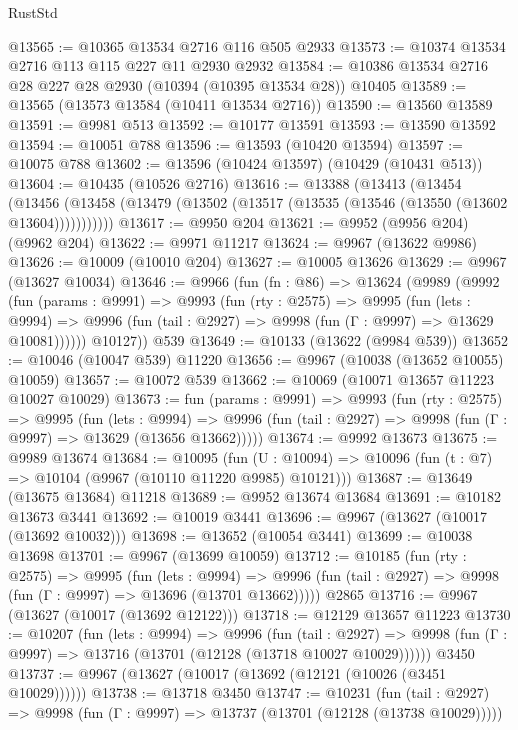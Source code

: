 \begin{lexlean}{RustStd}
\begin{coremodule}
@13565 := @10365 @13534 @2716 @116 @505 @2933
@13573 := @10374 @13534 @2716 @113 @115 @227 @11 @2930 @2932
@13584 := @10386 @13534 @2716 @28 @227 @28 @2930 (@10394 (@10395 @13534 @28)) @10405
@13589 := @13565 (@13573 @13584 (@10411 @13534 @2716))
@13590 := @13560 @13589
@13591 := @9981 @513
@13592 := @10177 @13591
@13593 := @13590 @13592
@13594 := @10051 @788
@13596 := @13593 (@10420 @13594)
@13597 := @10075 @788
@13602 := @13596 (@10424 @13597) (@10429 (@10431 @513))
@13604 := @10435 (@10526 @2716)
@13616 := @13388
    (@13413
      (@13454
        (@13456 (@13458 (@13479 (@13502 (@13517 (@13535 (@13546 (@13550 (@13602 @13604)))))))))))
@13617 := @9950 @204
@13621 := @9952 (@9956 @204) (@9962 @204)
@13622 := @9971 @11217
@13624 := @9967 (@13622 @9986)
@13626 := @10009 (@10010 @204)
@13627 := @10005 @13626
@13629 := @9967 (@13627 @10034)
@13646 := @9966
    (fun (fn : @86) =>
    @13624
      (@9989
        (@9992
          (fun (params : @9991) =>
          @9993
            (fun (rty : @2575) =>
            @9995
              (fun (lets : @9994) =>
              @9996 (fun (tail : @2927) => @9998 (fun (Γ : @9997) => @13629 @10081))))))
        @10127))
    @539
@13649 := @10133 (@13622 (@9984 @539))
@13652 := @10046 (@10047 @539) @11220
@13656 := @9967 (@10038 (@13652 @10055) @10059)
@13657 := @10072 @539
@13662 := @10069 (@10071 @13657 @11223 @10027 @10029)
@13673 := fun (params : @9991) =>
  @9993
    (fun (rty : @2575) =>
    @9995
      (fun (lets : @9994) =>
      @9996 (fun (tail : @2927) => @9998 (fun (Γ : @9997) => @13629 (@13656 @13662)))))
@13674 := @9992 @13673
@13675 := @9989 @13674
@13684 := @10095
    (fun (U : @10094) => @10096 (fun (t : @7) => @10104 (@9967 (@10110 @11220 @9985) @10121)))
@13687 := @13649 (@13675 @13684) @11218
@13689 := @9952 @13674 @13684
@13691 := @10182 @13673 @3441
@13692 := @10019 @3441
@13696 := @9967 (@13627 (@10017 (@13692 @10032)))
@13698 := @13652 (@10054 @3441)
@13699 := @10038 @13698
@13701 := @9967 (@13699 @10059)
@13712 := @10185
    (fun (rty : @2575) =>
    @9995
      (fun (lets : @9994) =>
      @9996 (fun (tail : @2927) => @9998 (fun (Γ : @9997) => @13696 (@13701 @13662)))))
    @2865
@13716 := @9967 (@13627 (@10017 (@13692 @12122)))
@13718 := @12129 @13657 @11223
@13730 := @10207
    (fun (lets : @9994) =>
    @9996
      (fun (tail : @2927) =>
      @9998 (fun (Γ : @9997) => @13716 (@13701 (@12128 (@13718 @10027 @10029))))))
    @3450
@13737 := @9967 (@13627 (@10017 (@13692 (@12121 (@10026 (@3451 @10029))))))
@13738 := @13718 @3450
@13747 := @10231
    (fun (tail : @2927) => @9998 (fun (Γ : @9997) => @13737 (@13701 (@12128 (@13738 @10029)))))

\end{coremodule}
\end{lexlean}
